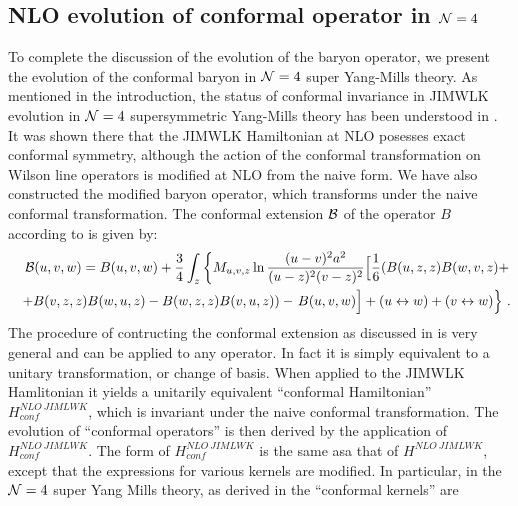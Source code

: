 \documentclass[11pt,a4paper]{article}
\begin{document}
\subsection{NLO evolution of conformal operator in ${\cal N}=4$ }
To complete the discussion of the evolution of the baryon operator, we present the evolution of the conformal baryon in ${\cal N}=4$ super Yang-Mills theory.
As mentioned in the introduction, the status of conformal invariance in JIMWLK evolution in ${\cal N}=4$  supersymmetric Yang-Mills theory has been understood in \cite{KLMconf}. It was shown there that the JIMWLK Hamiltonian at NLO posesses exact conformal symmetry, although the action of the conformal transformation on Wilson line operators is modified at NLO from the naive form. We have also constructed the modified baryon operator, which transforms under the naive conformal transformation.
The conformal extension ${\cal B}$ of the operator $B$ according to \cite{KLMconf} is given by:
\begin{eqnarray}
&&{\cal B}(u,v,w)=B(u,v,w)+\frac{3}{4}\int_z \left\{ M_{u,v,z}\ln\frac{(u-v)^2a^2}{(u-z)^2(v-z)^2} \Big[\frac{1}{ 6}(B(u,z,z)B(w,v,z)+\right. \nonumber \\ &&+B(v,z,z)B(w,u,z)-B(w,z,z)B(v,u,z)) 
 -\left. B(u,v,w)\Big]+(u\leftrightarrow w)+(v\leftrightarrow w)\right\}\,. \nonumber \\
\end{eqnarray}
The procedure of contructing the conformal extension as discussed in \cite{KLMconf} is very general and can be applied to any operator. In fact it is simply equivalent to a unitary transformation, or change of basis. When applied to the JIMWLK Hamlitonian it yields a unitarily equivalent ``conformal Hamiltonian'' $H^{NLO\ JIMLWK}_{conf}$, which is invariant under the naive conformal transformation. The evolution of ``conformal operators'' is then derived by the application of $H^{NLO\ JIMLWK}_{conf}$. The form of $H^{NLO\ JIMLWK}_{conf}$ is the same asa that of $H^{NLO\ JIMLWK}$, except that the expressions for various kernels are modified.
In particular, in the ${\cal N}=4$ super Yang Mills theory, as derived in \cite{KLMconf} the ``conformal kernels'' are
\end{document}
